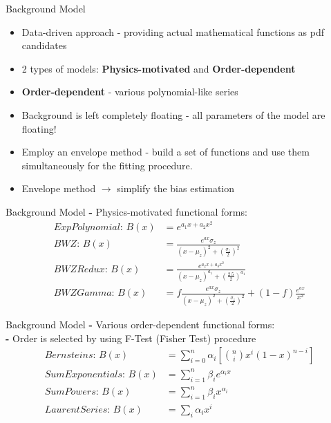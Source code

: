 \documentclass[pdf, 9pt]{beamer}
\begin{document}
  \begin{frame}{Background Model}
    \begin{itemize}
      \item Data-driven approach - providing actual mathematical functions as pdf candidates
      \item 2 types of models: \textbf{Physics-motivated}  and \textbf{Order-dependent}
      \item \textbf{Order-dependent} - various polynomial-like series
      \item Background is left completely floating - all parameters of the model are floating!
      \item Employ an envelope method - build a set of functions and use them simultaneously for the fitting procedure.
      \item Envelope method $\rightarrow$ simplify the bias estimation
    \end{itemize}
  \end{frame}

  \begin{frame}{Background Model}
    \textbf{-} Physics-motivated functional forms:\\\vspace{-0.2cm}
    \begin{align}
        \textit{ExpPolynomial: } {B(x)}& = {e^{a_{1}x + a_{2}x^2}} \\
        \textit{BWZ: } {B(x)}& = {\frac{e^{ax}\sigma_{z}}{(x-\mu_{z})^2 + (\frac{\sigma_{z}}{2})^2}} \\
        \textit{BWZRedux: } {B(x)}& = {\frac{e^{a_{2}x + a_{3}x^2}}{(x-\mu_{z})^{a_{1}} + (\frac{2.5}{2})^{a_{1}}}} \\
        \textit{BWZGamma: } {B(x)}& = {f\frac{e^{ax}\sigma_{z}}{(x-\mu_{z})^2 + (\frac{\sigma_{z}}{2})^2} + (1-f)\frac{e^{ax}}{x^2}}
    \end{align}
  \end{frame}

  \begin{frame}{Background Model}
    \textbf{-} Various order-dependent functional forms:\\\vspace{0.02cm}
    \textbf{-} Order is selected by using F-Test (Fisher Test) procedure\\\vspace{-0.2cm}
    \begin{align}
        \textit{Bernsteins: } {B(x)}& = {\sum_{i=0}^{n} \alpha_i[\binom{n}{i}x^{i}(1-x)^{n-i}]} \\
        \textit{SumExponentials: } {B(x)}& = {\sum_{i=1}^{n} \beta_{i}e^{\alpha_{i}x}}\\
        \textit{SumPowers: } {B(x)}& = {\sum_{i=1}^{n} \beta_{i}x^{\alpha_{i}}}\\
        \textit{LaurentSeries: } {B(x)}& = {\sum_{i} \alpha_{i}x^{i}}
    \end{align}
  \end{frame}
\end{document}

